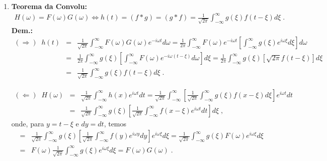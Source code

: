 \begin{enumerate}
\item {\bf Teorema da Convolu\cao:}
\begin{eqnarray*}
H(\omega) = F(\omega)G(\omega) \Longleftrightarrow
h(t) = (f*g) = (g*f) = \frac{1}{\sqrt{2\pi}} \int_{-\infty}^{\infty}
g(\xi)f(t-\xi) d\xi \; .
\end{eqnarray*}
{\bf Dem.:} 
\begin{eqnarray*}
(\Rightarrow) \; \; h(t) &=& \frac{1}{\sqrt{2\pi}}
\int_{-\infty}^{\infty} F(\omega)G(\omega) e^{-i\omega t} d\omega
= \frac{1}{2\pi}\int_{-\infty}^{\infty} F(\omega)e^{-i\omega t}
\left[\int_{-\infty}^{\infty} g(\xi) e^{i\omega \xi} d\xi \right]
d\omega \\
&=& \frac{1}{2\pi}\int_{-\infty}^{\infty} g(\xi)
\left[ \int_{-\infty}^{\infty} F(\omega) e^{-i\omega (t-\xi)} d\omega
\right] d\xi = \frac{1}{2\pi} \int_{-\infty}^{\infty} g(\xi)
\left[ \sqrt{2\pi} f(t-\xi)\right] d\xi \\
&=& \frac{1}{\sqrt{2\pi}} \int_{-\infty}^{\infty} g(\xi)f(t-\xi)
d\xi \; .
\end{eqnarray*}

\begin{eqnarray*}
(\Leftarrow) \; \; H(\omega) &=& \frac{1}{\sqrt{2\pi}} \int_{-\infty}^{\infty}
h(x) e^{i \omega t} dt = \frac{1}{\sqrt{2\pi}} \int_{-\infty}^{\infty}
\left[\frac{1}{\sqrt{2\pi}} \int_{-\infty}^{\infty} g(\xi) f(x-\xi) d\xi
\right] e^{i \omega t} dt \\
&=& \frac{1}{\sqrt{2\pi}} \int_{-\infty}^{\infty} g(\xi) \left[
\frac{1}{\sqrt{2\pi}} \int_{-\infty}^{\infty} f(x-\xi) e^{i \omega t} dt
\right] d\xi \; ,
\end{eqnarray*}
onde, para $y = t - \xi$ e $dy = dt$, temos
\begin{eqnarray*}
&=& \frac{1}{\sqrt{2\pi}} \int_{-\infty}^{\infty} g(\xi) \left[
\frac{1}{\sqrt{2\pi}} \int_{-\infty}^{\infty} f(y) e^{i \omega y} dy
\right] e^{i \omega \xi} d\xi = \frac{1}{\sqrt{2\pi}}
\int_{-\infty}^{\infty} g(\xi) F(\omega) e^{i \omega \xi} d\xi \\
&=& F(\omega) \frac{1}{\sqrt{2\pi}}\int_{-\infty}^{\infty} g(\xi)
e^{i \omega \xi} d\xi = F(\omega) G(\omega) \; .
\end{eqnarray*}

\end{enumerate}



